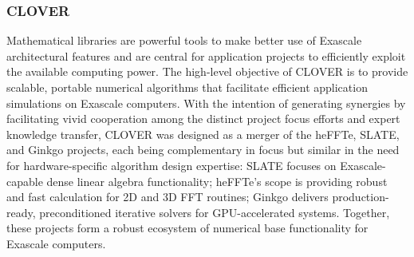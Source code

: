 \subsubsection{ CLOVER} \label{subsubsect:clover}
Mathematical libraries are powerful tools to make better use of Exascale 
architectural features and are central for application projects to efficiently 
exploit the available computing power. The high-level objective of CLOVER is to 
provide scalable, portable numerical algorithms that facilitate efficient 
application simulations on Exascale computers. With the intention of generating synergies 
by facilitating vivid cooperation among the distinct project focus efforts 
and expert knowledge transfer, CLOVER was designed as a merger of the heFFTe, SLATE, 
and Ginkgo projects, each being complementary 
in focus but similar in the need for hardware-specific algorithm design 
expertise: SLATE focuses on Exascale-capable dense linear algebra 
functionality; heFFTe’s scope is providing robust and fast calculation for 2D 
and 3D FFT routines; Ginkgo delivers production-ready, preconditioned iterative solvers for 
GPU-accelerated systems. Together, these projects form a robust ecosystem of numerical 
base functionality for Exascale computers.
\newpage
